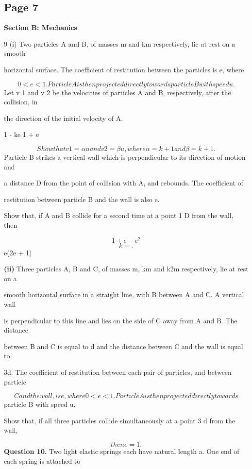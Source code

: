 \documentclass[12pt]{article}
\begin{document}
\subsection*{Page 7}
\begin{flushleft}
\bigskip\textbf{Section B: Mechanics}\par
9 (i) Two particles A and B, of masses m and km respectively, lie at rest on a smooth\par
horizontal surface. The coefficient of restitution between the particles is e, where\par
\[0 < e < 1. Particle A is then projected directly towards particle B with speed u.\]
Let v 1 and v 2 be the velocities of particles A and B, respectively, after the collision, in\par
the direction of the initial velocity of A.\par
1 - ke 1 + e\par
\[Show that v 1 = αu and v 2 = βu, where α = k + 1 and β = k + 1 .\]
Particle B strikes a vertical wall which is perpendicular to its direction of motion and\par
a distance D from the point of collision with A, and rebounds. The coefficient of\par
restitution between particle B and the wall is also e.\par
Show that, if A and B collide for a second time at a point 1 D from the wall, then\par
\[1 + e - e^2\]
\[k = .\]
e(2e + 1)\par
\textbf{(ii)} Three particles A, B and C, of masses m, km and k2m respectively, lie at rest on a\par
smooth horizontal surface in a straight line, with B between A and C. A vertical wall\par
is perpendicular to this line and lies on the side of C away from A and B. The distance\par
between B and C is equal to d and the distance between C and the wall is equal to\par
3d. The coefficient of restitution between each pair of particles, and between particle\par
\[C and the wall, is e, where 0 < e < 1. Particle A is then projected directly towards\]
particle B with speed u.\par
Show that, if all three particles collide simultaneously at a point 3 d from the wall,\par
\[then e = 1 .\]
\bigskip\textbf{Question 10.} Two light elastic springs each have natural length a. One end of each spring is attached to\par

\end{flushleft}
\end{document}

